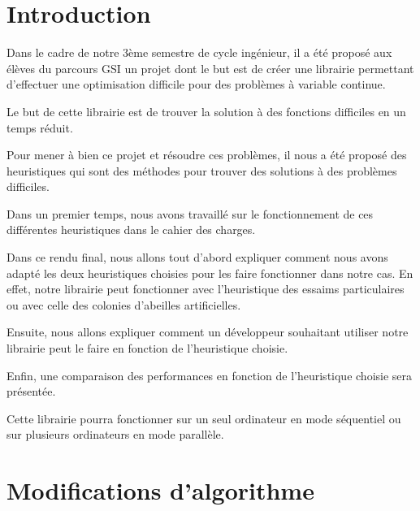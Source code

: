 \documentclass[12pt]{article}
\begin{document}
\newpage



\section*{Introduction} %

Dans le cadre de notre 3ème semestre de cycle ingénieur, il a été proposé aux élèves du parcours GSI un projet dont le but est de créer une librairie permettant d'effectuer une optimisation difficile pour des problèmes à variable continue.

Le but de cette librairie est de trouver la solution à des fonctions difficiles en un temps réduit.

Pour mener à bien ce projet et résoudre ces problèmes, il nous a été proposé des heuristiques qui sont des méthodes pour trouver des solutions à des problèmes difficiles. 

Dans un premier temps, nous avons travaillé sur le fonctionnement de ces différentes heuristiques dans le cahier des charges.

Dans ce rendu final, nous allons tout d'abord expliquer comment nous avons adapté les deux heuristiques choisies pour les faire fonctionner dans notre cas.
En effet, notre librairie peut fonctionner avec l'heuristique des essaims particulaires ou avec celle des colonies d'abeilles artificielles. 

Ensuite, nous allons expliquer comment un développeur souhaitant utiliser notre librairie peut le faire en fonction de l'heuristique choisie.

Enfin, une comparaison des performances en fonction de l'heuristique choisie sera présentée.

Cette librairie pourra fonctionner sur un seul ordinateur en mode séquentiel ou sur plusieurs ordinateurs en mode parallèle. 

\newpage
\section{Modifications d'algorithme}
\end{document}
